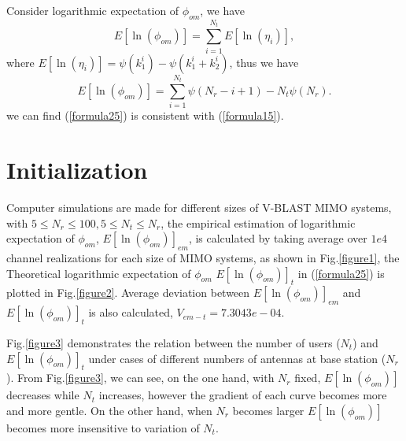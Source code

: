 \documentclass[12pt, draftclsnofoot, onecolumn]{IEEEtran}
\begin{document}
Consider logarithmic expectation of $\phi_{om}$, we have
\begin{equation}
E[\ln(\phi_{om})]=\sum_{i=1}^{N_{t}}E[\ln(\eta_{i})],
\label{formula24}
\end{equation}
where $E[\ln(\eta_{i})]=\psi(k^{i}_{1})-\psi(k^{i}_{1}+k^{i}_{2})$, thus we have 
\begin{equation}
E[\ln(\phi_{om})]=\sum_{i=1}^{N_{t}}\psi(N_{r}-i+1)-N_{t}\psi(N_{r}).
\label{formula25}
\end{equation}
we can find (\ref{formula25}) is consistent with (\ref{formula15}). 

\section{Initialization}\label{Initialization}
 Computer simulations are made for different sizes of V-BLAST MIMO systems, with $5\leq N_{r} \leq 100, 5 \leq N_{t} \leq N_{r}$, the empirical estimation of logarithmic expectation of $\phi_{om}$, $E[\ln(\phi_{om})]_{em}$, is calculated by taking average over $1e4$ channel realizations for each size of MIMO systems, as shown in Fig.\ref{figure1}, the Theoretical logarithmic expectation of $\phi_{om}$ $E[\ln(\phi_{om})]_{t}$ in (\ref{formula25}) is plotted in Fig.\ref{figure2}. Average deviation between $E[\ln(\phi_{om})]_{em}$ and $E[\ln(\phi_{om})]_{t}$ is also calculated, $V_{em-t}= 7.3043e-04$.





Fig.\ref{figure3} demonstrates the relation between the number of users ($N_{t}$) and $E[\ln(\phi_{om})]_{t}$ under cases of different numbers of antennas at base station ($N_{r}$). From Fig.\ref{figure3}, we can see, on the one hand, with $N_{r}$ fixed, $E[\ln(\phi_{om})]$ decreases while $N_{t}$ increases, however the gradient of each curve becomes more and more gentle. On the other hand, when $N_{r}$ becomes larger $E[\ln(\phi_{om})]$ becomes more insensitive to variation of $N_{t}$.
\end{document}
